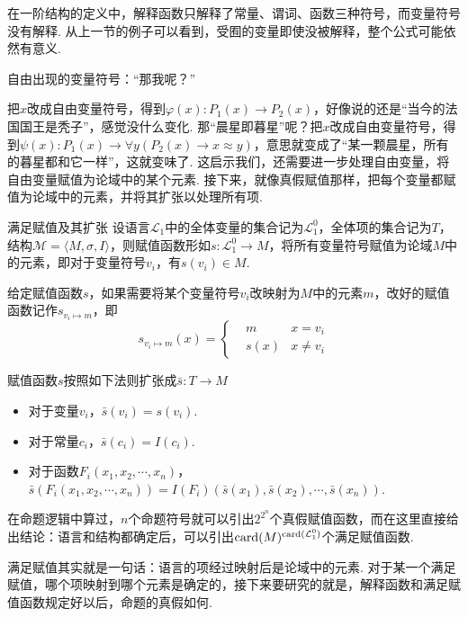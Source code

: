 \documentclass[main.tex]{subfiles}
\begin{document}
在一阶结构的定义中，解释函数只解释了常量、谓词、函数三种符号，而变量符号没有解释. 从上一节的例子可以看到，受囿的变量即使没被解释，整个公式可能依然有意义. 

\begin{center}
    自由出现的变量符号：“那我呢？”
\end{center}

把\(x\)改成自由变量符号，得到\(\varphi(x): P_1(x) \to P_2(x)\)，好像说的还是“当今的法国国王是秃子”，感觉没什么变化. 那“晨星即暮星”呢？把\(x\)改成自由变量符号，得到\(\psi(x): P_1(x) \to \forall y (P_2(x) \to x \approx y)\)，意思就变成了“某一颗晨星，所有的暮星都和它一样”，这就变味了. 这启示我们，还需要进一步处理自由变量，将自由变量赋值为论域中的某个元素. 接下来，就像真假赋值那样，把每个变量都赋值为论域中的元素，并将其扩张以处理所有项.

\begin{definition}{满足赋值及其扩张}
    设语言\(\mathcal{L}_1\)中的全体变量的集合记为\(\mathcal{L}_1^0\)，全体项的集合记为\(T\)，结构\(\mathcal{M} = \langle M,\sigma, I \rangle\)，则赋值函数形如\(s:\mathcal{L}_1^0 \to M\)，将所有变量符号赋值为论域\(M\)中的元素，即对于变量符号\(v_i\)，有\(s(v_i) \in M\). 

    给定赋值函数\(s\)，如果需要将某个变量符号\(v_i\)改映射为\(M\)中的元素\(m\)，改好的赋值函数记作\(s_{v_i \mapsto m}\)，即
    \[s_{v_i \mapsto m}(x) = \left\{ \begin{aligned} &m &x=v_i \\ & s(x) & x \neq v_i \end{aligned} \right.\]

    赋值函数\(s\)按照如下法则扩张成\(\bar{s}: T \to M\)
    \begin{itemize}
        \item 对于变量\(v_i\)，\(\bar{s}(v_i) = s(v_i)\).
        \item 对于常量\(c_i\)，\(\bar{s}(c_i) = I(c_i)\).
        \item 对于函数\(F_i(x_1, x_2, \cdots, x_n)\)，\(\bar{s}(F_i(x_1, x_2, \cdots, x_n)) = I(F_i)(\bar s(x_1), \bar s(x_2), \cdots, \bar s(x_n))\).
    \end{itemize}
\end{definition}

在命题逻辑中算过，\(n\)个命题符号就可以引出\(2^{2^n}\)个真假赋值函数，而在这里直接给出结论：语言和结构都确定后，可以引出\({\rm card}(M)^{{\rm card}(\mathcal{L}_1^0)}\)个满足赋值函数. 

满足赋值其实就是一句话：语言的项经过映射后是论域中的元素. 对于某一个满足赋值，哪个项映射到哪个元素是确定的，接下来要研究的就是，解释函数和满足赋值函数规定好以后，命题的真假如何. 
\end{document}
